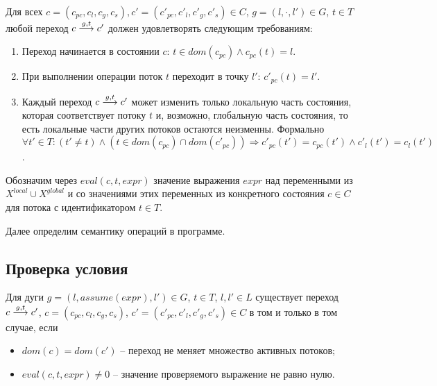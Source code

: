 Для всех $c=(c_{pc}, c_l, c_g, c_s), c'=(c'_{pc}, c'_l, c'_g, c'_s) \in C$, $g = (l, \cdot, l')\in G$, $t\in T$ любой переход $c \stackrel{g, t}{\longrightarrow} c'$ должен удовлетворять следующим требованиям:
\begin{enumerate}
\item Переход начинается в состоянии $c$: $t\in dom(c_{pc}) \land c_{pc}(t)=l$.
\item При выполнении операции поток $t$ переходит в точку $l'$: $c'_{pc}(t)=l'$.
\item Каждый переход $c \stackrel{g,t}{\longrightarrow} c'$ может изменить только локальную часть состояния, которая соответствует потоку $t$ и, возможно, глобальную часть состояния, то есть локальные части других потоков остаются неизменны.
Формально
$\forall t'\in T: (t'\neq t) \land (t \in dom(c_{pc})\cap dom(c'_{pc})) \Rightarrow c'_{pc}(t')=c_{pc}(t') \land c'_l(t')=c_l(t')$.
\end{enumerate}

Обозначим через $eval(c, t, expr)$ значение выражения $expr$ над переменными из $X^{local} \cup X^{global}$ и со значениями этих переменных из конкретного состояния $c \in C$ для потока с идентификатором $t \in T$. %

Далее определим семантику операций в программе.

\subsection{Проверка условия}
Для дуги $g = (l, assume(expr), l') \in G$, $t\in T$, $l, l' \in L$ существует переход $c \stackrel{g, t}{\longrightarrow} c'$, $c=(c_{pc}, c_l, c_g, c_s)$, $c'=(c'_{pc}, c'_l, c'_g, c'_s) \in C$ в том и только в том случае, если
\begin{itemize}
\item $dom(c)=dom(c')$ -- переход не меняет множество активных потоков;
\item $eval(c, t, expr) \neq 0$ -- значение проверяемого выражение не равно нулю.
\end{itemize}

